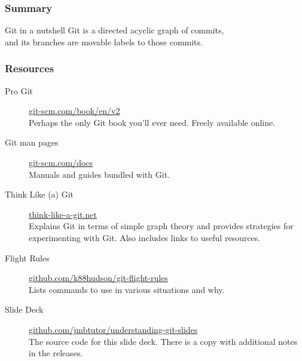 \documentclass{beamer}
\begin{document}
\begin{frame}
  \frametitle{Summary}
  \begin{block}{Git in a nutshell}
    Git is a directed acyclic graph of commits,\\
    and its branches are movable labels to those commits.
  \end{block}
\end{frame}

\begin{frame}
  \frametitle{Resources}
  \begin{description}
    \item[Pro Git] \href{https://git-scm.com/book/en/v2}{git-scm.com/book/en/v2}\\
      Perhaps the only Git book you'll ever need. Freely available online.
    \item[Git man pages] \href{https://git-scm.com/docs}{git-scm.com/docs}\\
      Manuals and guides bundled with Git.
    \item[Think Like (a) Git] \href{http://think-like-a-git.net}{think-like-a-git.net}\\
      Explains Git in terms of simple graph theory and provides strategies for experimenting with Git. Also includes links to useful resources.
    \item[Flight Rules] \href{https://github.com/k88hudson/git-flight-rules}{github.com/k88hudson/git-flight-rules}\\
      Lists commands to use in various situations and why. %
    \item[Slide Deck] \href{https://github.com/jmbtutor/understanding-git-slides}{github.com/jmbtutor/understanding-git-slides}\\
      The source code for this slide deck. There is a copy with additional notes in the releases.
  \end{description}
\end{frame}
\end{document}
